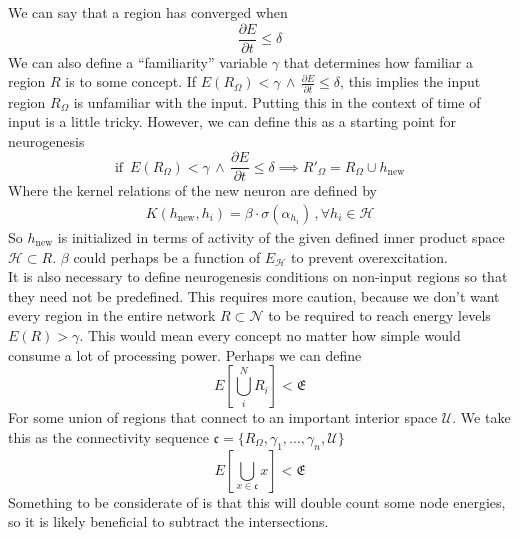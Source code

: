\documentclass[twocolumn, 10pt]{article}
\begin{document}
We can say that a region has converged when 
\begin{equation}
    \frac{\partial E}{\partial t} \le \delta
\end{equation}
We can also define a ``familiarity'' variable $\gamma$ that determines how familiar a region $R$ is to some concept. If $E(R_\Omega) < \gamma \, \land  \, \frac{\partial E}{\partial t} \le \delta$, this implies the input region $R_\Omega$ is unfamiliar with the input. Putting this in the context of time of input is a little tricky. However, we can define this as a starting point for neurogenesis
\begin{equation}
    \text{if} \, \, \, E(R_\Omega) < \gamma \, \land  \, \frac{\partial E}{\partial t} \le \delta \implies R'_\Omega = R_\Omega \cup h_{\text{new}}
\end{equation}
Where the kernel relations of the new neuron are defined by
\begin{align*}
    K(h_{\text{new}}, h_i) = \beta \cdot \sigma(\alpha_{h_i}) \,, \forall h_i \in \mathcal{H}
\end{align*}
So $h_{\text{new}}$ is initialized in terms of activity of the given defined inner product space $\mathcal{H} \subset R$. $\beta$ could perhaps be a function of $E_\mathcal{H}$ to prevent overexcitation. \\

It is also necessary to define neurogenesis conditions on non-input regions so that they need not be predefined. This requires more caution, because we don't want every region in the entire network $R \subset \mathcal{N}$ to be required to reach energy levels $E(R) > \gamma$. This would mean every concept no matter how simple would consume a lot of processing power. Perhaps we can define 
\begin{equation}
    E \left[ \bigcup_i^N R_i \right] < \mathfrak{E}
\end{equation}
For some union of regions that connect to an important interior space $\mathcal{U}$. We take this as the connectivity sequence $\mathfrak{c} = \{ R_\Omega , \gamma_1, ..., \gamma_n, \mathcal{U}  \}$
\begin{equation}
    E \left[ \bigcup_{x \in \mathfrak{c}} x \right] < \mathfrak{E}
\end{equation}
Something to be considerate of is that this will double count some node energies, so it is likely beneficial to subtract the intersections.
\end{document}
